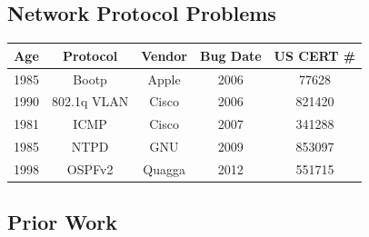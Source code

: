 \subsection{Network Protocol Problems }

\begin{tabular}{|c|c|c|c|c|}
   \hline
   Age & Protocol & Vendor & Bug Date & US CERT \# \\ \hline
   \hline
   1985 & Bootp & Apple & 2006 & 77628 \\ \hline
   1990 & 802.1q VLAN & Cisco & 2006 & 821420 \\ \hline
   1981 & ICMP & Cisco & 2007 & 341288 \\ \hline
   1985 & NTPD & GNU & 2009 & 853097 \\ \hline
   1998 & OSPFv2 & Quagga & 2012 & 551715 \\ \hline
\end{tabular}

\subsection{Prior Work}

